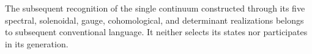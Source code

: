 The subsequent recognition of the single continuum constructed through its five
spectral, solenoidal, gauge, cohomological, and determinant realizations
belongs to subsequent conventional language. It neither selects its states nor
participates in its generation.
\fi


